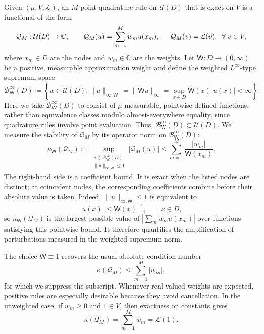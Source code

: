 \documentclass[10pt,dvipsnames]{amsart}
\begin{document}
Given \((\mu,V,\mathcal L)\), an \(M\)-point quadrature rule on
\(\mathcal U(D)\) that is exact on \(V\) is a functional of the form
\begin{equation}\label{eq:Q-V-exact}
    \mathcal Q_M:\mathcal U(D)\to\mathbb C,
    \qquad
    \mathcal Q_M(u)
    =
    \sum_{m=1}^M w_m u(x_m), \hskip 15pt
    \mathcal Q_M(v)=\mathcal L(v),
        \;\; \forall\;v\in V,
\end{equation}
where \(x_m\in D\) are the nodes and \(w_m\in\mathbb C\) are the weights.  Let \(\mathsf W:D\to(0,\infty)\) be a positive, measurable approximation weight and define the weighted $L^\infty$-type supremum space
\begin{equation}
\label{eq:weighted-sup-space}
    \mathcal{B}^\infty_{\mathsf W}(D)
    \coloneqq
    \left\{
        u\in\mathcal{U}(D):
        \|u\|_{\infty,\mathsf W}
        \coloneqq
        \|\mathsf W u\|_\infty
        =
        \sup_{x\in D}\mathsf W(x)|u(x)|
        <\infty
    \right\}.
\end{equation}
Here we take \(\mathcal{B}^\infty_{\mathsf W}(D)\) to consist of \(\mu\)-measurable,
pointwise-defined functions, rather than equivalence classes modulo
almost-everywhere equality, since quadrature rules involve point evaluation.
Thus, \(\mathcal{B}^\infty_{\mathsf W}(D)\subset\mathcal U(D)\).
We measure the stability of \(\mathcal Q_M\) by its operator norm on
\(\mathcal{B}^\infty_{\mathsf W}(D)\):
\begin{equation}
\label{eq:condition-number}
    \kappa_{\mathsf W}(\mathcal Q_M)
    \coloneqq
    \sup_{\substack{u\in \mathcal{B}^\infty_{\mathsf W}(D)\\
    \|u\|_{\infty,\mathsf W}\leq1}}
    |\mathcal Q_M(u)|
    \leq
    \sum_{m=1}^M
    \frac{|w_m|}{\mathsf W(x_m)}.
\end{equation}
The right-hand side is a coefficient bound. It is exact when the listed nodes
are distinct; at coincident nodes, the corresponding coefficients combine
before their absolute value is taken.
Indeed, \(\|u\|_{\infty,\mathsf W}\leq1\) is equivalent to
\[
    |u(x)|\leq\mathsf W(x)^{-1},
    \qquad x\in D,
\]
so \(\kappa_{\mathsf W}(\mathcal Q_M)\) is the largest possible value of
\(\left|\sum_m w_m u(x_m)\right|\) over functions satisfying this pointwise
bound. It therefore quantifies the amplification of perturbations measured in
the weighted supremum norm.


The choice \(\mathsf W\equiv1\) recovers the usual absolute condition number
\begin{equation}
    \label{eq:standard-condition-number}
    \kappa(\mathcal Q_M)\leq\sum_{m=1}^M|w_m|,
\end{equation}
for which we suppress the subscript. Whenever real-valued weights are expected,
positive rules are especially desirable because they avoid cancellation. In
the unweighted case, if \(w_m\geq0\) and \(1\in V\), then exactness on constants
gives
\[
    \kappa(\mathcal Q_M)
    =
    \sum_{m=1}^M w_m
    =
    \mathcal L(1).
\]
\end{document}
